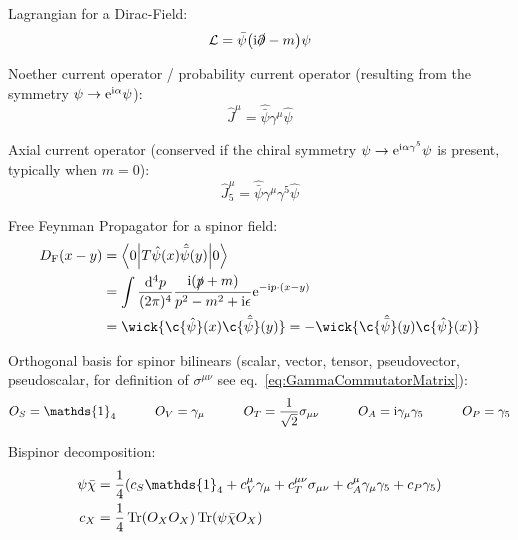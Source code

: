 			\noindent
			Lagrangian for a Dirac-Field:
			\begin{equation}
				\mathcal{L} = \bar{\psi} \qty(\mathrm{i} \slashed{\partial} - m) \psi
			\end{equation}

			\noindent
			Noether current operator / probability current operator (resulting from the symmetry $\psi \to \mathrm{e}^{\mathrm{i} \alpha} \psi$):
			\begin{equation}
				\hat{J}^\mu = \hat{\bar{\psi}} \gamma^\mu \hat{\psi}
			\end{equation}

			\noindent
			Axial current operator (conserved if the chiral symmetry $\psi \to \mathrm{e}^{\mathrm{i} \alpha \gamma^5} \psi$ is present, typically when $m=0$):
			\begin{equation}
				\hat{J}^\mu_5 = \hat{\bar{\psi}} \gamma^\mu \gamma^5 \hat{\psi}
			\end{equation}

			\noindent
			Free Feynman Propagator for a spinor field:
			\begin{equation}
				\begin{aligned}
					D_\text{F}(x-y) &= \mel**{0}{T\hat{\psi}(x)\hat{\bar\psi}(y)}{0} \\
					&= \int \frac{\dd^4 p}{(2\pi)^4} \frac{\i(\slashed{p}+m)}{p^2-m^2+\i\epsilon} \ex^{-\i p\cdot(x-y)} \\
					&= \wick{\c{\hat{\psi}}(x) \c{\hat{\bar{\psi}}}(y)} = - \wick{\c{\hat{\bar{\psi}}}(y) \c{\hat\psi}(x)}
				\end{aligned}
			\end{equation}

			\noindent
			Orthogonal basis for spinor bilinears (scalar, vector, tensor, pseudovector, pseudoscalar, for definition of $\sigma^{\mu\nu}$ see eq.~\ref{eq:GammaCommutatorMatrix}):
			\begin{equation}
				O_S = \mathds{1}_4
				\hsp
				O_V = \gamma_\mu
				\hsp
				O_T = \frac{1}{\sqrt{2}} \sigma_{\mu\nu}
				\hsp
				O_A = \i \gamma_\mu \gamma_5
				\hsp
				O_P = \gamma_5
			\end{equation}

			\noindent
			Bispinor decomposition:
			\begin{align}
				\psi\bar{\chi} &= \frac{1}{4} \qty( c_S \mathds{1}_4 + c_V^\mu \gamma_\mu + c_T^{\mu\nu} \sigma_{\mu\nu} + c_A^\mu \gamma_\mu \gamma_5 + c_P \gamma_5 ) \\
				c_X &= \frac{1}{4} \tr(O_X O_X) \tr(\psi \bar{\chi} O_X)
			\end{align}

